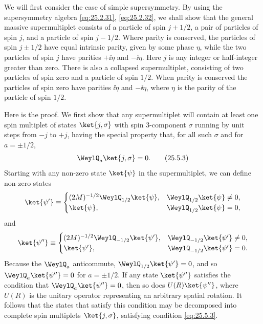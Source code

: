 We will first consider the case of simple supersymmetry. By using the
supersymmetry algebra \eqref{eq:25.2.31}, \eqref{eq:25.2.32}, we shall show
that the general massive supermultiplet consists of a particle of spin
$j+1/2$, a pair of particles of spin $j$, and a particle of spin $j-1/2$.
Where parity is conserved, the particles of spin $j\pm1/2$ have equal
intrinsic parity, given by some phase $\eta$, while the two particles of spin
$j$ have parities $+\ii\eta$ and $-\ii\eta$. Here $j$ is any integer or
half-integer greater than zero. There is also a collapsed supermultiplet,
consisting of two particles of spin zero and a particle of spin $1/2$. When
parity is conserved the particles of spin zero have parities $\ii\eta$ and
$-\ii\eta$, where $\eta$ is the parity of the particle of spin $1/2$.

Here is the proof. We first show that any supermultiplet will contain at least
one spin multiplet of states $\ket{j,\sigma}$ with spin 3-component $\sigma$
running by unit steps from $-j$ to $+j$, having the special property that, for
all such $\sigma$ and for $a=\pm1/2$,
\begin{equation}
 \WeylQ_a\ket{j,\sigma}=0.
\tag{25.5.3}\label{eq:25.5.3}
\end{equation}
Starting with any non-zero state $\ket{\psi}$ in the supermultiplet, we can
define non-zero states
\[
 \ket{\psi'}\equiv
 \begin{cases}
 (2M)^{-1/2}\WeylQ_{1/2}\ket{\psi},
   &\WeylQ_{1/2}\ket{\psi}\ne0,\\
 \ket{\psi},
   &\WeylQ_{1/2}\ket{\psi}=0,
 \end{cases}
\]
and
\[
 \ket{\psi''}\equiv
 \begin{cases}
 (2M)^{-1/2}\WeylQ_{-1/2}\ket{\psi'},
   &\WeylQ_{-1/2}\ket{\psi'}\ne0,\\
 \ket{\psi'},
   &\WeylQ_{-1/2}\ket{\psi'}=0.
 \end{cases}
\]
Because the $\WeylQ_a$ anticommute, $\WeylQ_{1/2}\ket{\psi'}=0$, and so
$\WeylQ_a\ket{\psi''}=0$ for $a=\pm1/2$. If any state $\ket{\psi''}$
satisfies the condition that $\WeylQ_a\ket{\psi''}=0$, then so does
$U(R)\ket{\psi''}$, where $U(R)$ is the unitary operator representing an
arbitrary spatial rotation. It follows that the states that satisfy this
condition may be decomposed into complete spin multiplets $\ket{j,\sigma}$,
satisfying condition \eqref{eq:25.5.3}.


